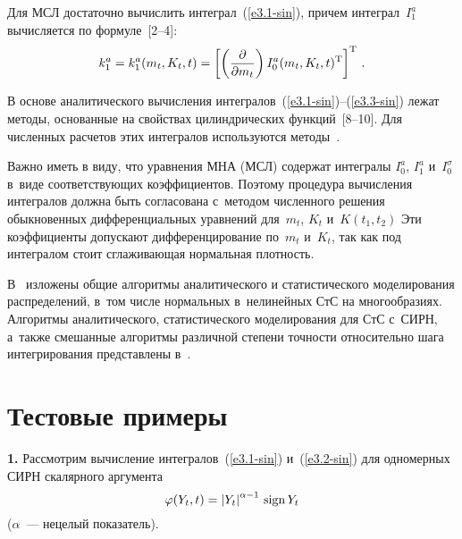 \begin{multicols}{2}
Для МСЛ достаточно вычислить интеграл~(\ref{e3.1-sin}), причем интеграл~$I_1^a$
вычисляется по формуле~[2--4]:
\begin{equation*}
k_1^a = k_1^a (m_t, K_t, t)=\lk \left( \fr{\prt}{\prt m_t}\right)
I_0^a (m_t, K_t, t)^{\mathrm{T}}\rk^{\mathrm{T}}\,. %
\end{equation*}

В основе аналитического вычисления интегралов~(\ref{e3.1-sin})--(\ref{e3.3-sin})
лежат методы, основанные на свойствах цилиндрических функций~[8--10].
Для чис\-лен\-ных расчетов этих интегралов используются \mbox{методы}~\cite{8-sin}.

 Важно иметь в виду, что уравнения МНА (МСЛ) содержат интегралы
 $I_0^a$, $I_1^a$ и~$I_0^\sigma$ в~виде соответ\-ст\-ву\-ющих коэффициентов.
 Поэтому процедура вы\-числе\-ния интегралов должна быть согласована с~мето\-дом
 численного решения обыкновенных дифференциальных уравнений для~$m_t$, $K_t$
 и~$K(t_1, t_2)$ Эти коэффициенты допускают дифференцирование по~$m_t$ и~$K_t$,
 так как под интегралом стоит сглаживающая нормальная плотность.

В~\cite{5-sin} изложены общие алгоритмы аналитического и статистического
моделирования распределений, в~том числе нормальных в~нелинейных
СтС на многообразиях. Алгоритмы аналитического, статистического
моделирования для СтС с~СИРН, а~также смешанные алгоритмы различной
степени точности относительно шага интегрирования представлены в~\cite{5-sin}.

\section{Тестовые примеры}

\textbf{1.}
Рассмотрим вычисление интегралов~(\ref{e3.1-sin}) и~(\ref{e3.2-sin})
для одномерных СИРН скалярного аргумента
\begin{equation}
\varphi (Y_t, t) =\left\vert Y_t\right\vert^{\alpha-1}\, \mathrm{sign}\, Y_t
\label{e4.1-sin}
\end{equation}
($\alpha$~--- нецелый показатель).


\end{multicols}
